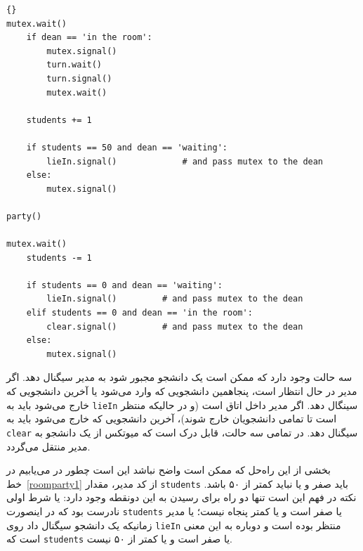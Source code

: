 \documentclass{book}
\begin{document}
\newpage
\begin{latin}
\begin{lstlisting}[title=\rl{راه‌حل اتاق پارتی (دانشجو)}]{}
mutex.wait()
    if dean == 'in the room':
        mutex.signal()
        turn.wait()
        turn.signal()
        mutex.wait()

    students += 1

    if students == 50 and dean == 'waiting':
        lieIn.signal()             # and pass mutex to the dean
    else:
        mutex.signal()

party()

mutex.wait()
    students -= 1

    if students == 0 and dean == 'waiting':
        lieIn.signal()         # and pass mutex to the dean
    elif students == 0 and dean == 'in the room':
        clear.signal()         # and pass mutex to the dean
    else:
        mutex.signal()
\end{lstlisting}
\end{latin}

    سه حالت وجود دارد که ممکن است یک دانشجو مجبور شود به مدیر سیگنال دهد. 
    اگر مدیر در حال انتظار است،  پنجاهمین دانشجویی که وارد می‌شود یا آخرین دانشجویی که خارج می‌شود باید  به {\tt lieIn} سینگال دهد.
    اگر مدیر داخل اتاق است (و در حالیکه منتظر است تا تمامی دانشجویان خارج شوند)، آخرین دانشجویی که خارج می‌شود باید به {\tt clear} سیگنال دهد. 
    در تمامی سه حالت، قابل درک است که میوتکس از یک دانشجو به مدیر منتقل می‌گردد. 

    بخشی از این راه‌حل که ممکن است واضح نباشد این است چطور در می‌یابیم در خط~\ref{roomparty1} از کد مدیر، مقدار {\tt students}  
    باید صفر و یا نباید کمتر از ۵۰ باشد. نکته در فهم این است تنها دو راه برای رسیدن به این دونقطه وجود دارد: یا شرط اولی نادرست بود 
    که در اینصورت  {\tt students} یا صفر است و یا کمتر پنجاه نیست؛‌ یا مدیر زمانیکه یک دانشجو سیگنال داد روی {\tt lieIn} منتظر بوده است و 
    دوباره به این معنی است که {\tt students}  یا صفر است و یا کمتر از ۵۰ نیست. 
    
\end{document}
